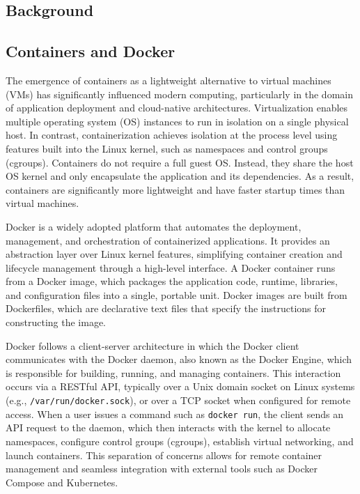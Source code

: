\documentclass[12pt]{report}
\begin{document}
\begin{doublespace}
\chapter{Background}



\section{Containers and Docker}

The emergence of containers as a lightweight alternative to virtual machines (VMs) has significantly influenced modern computing, particularly in the domain of application deployment and cloud-native architectures. Virtualization enables multiple operating system (OS) instances to run in isolation on a single physical host. In contrast, containerization achieves isolation at the process level using features built into the Linux kernel, such as namespaces and control groups (cgroups). Containers do not require a full guest OS. Instead, they share the host OS kernel and only encapsulate the application and its dependencies. As a result, containers are significantly more lightweight and have faster startup times than virtual machines.

Docker is a widely adopted platform that automates the deployment, management, and orchestration of containerized applications. It provides an abstraction layer over Linux kernel features, simplifying container creation and lifecycle management through a high-level interface. A Docker container runs from a Docker image, which packages the application code, runtime, libraries, and configuration files into a single, portable unit. Docker images are built from Dockerfiles, which are declarative text files that specify the instructions for constructing the image.

Docker follows a client-server architecture in which the Docker client communicates with the Docker daemon, also known as the Docker Engine, which is responsible for building, running, and managing containers. This interaction occurs via a RESTful API, typically over a Unix domain socket on Linux systems (e.g., \texttt{/var/run/docker.sock}), or over a TCP socket when configured for remote access. When a user issues a command such as \texttt{docker run}, the client sends an API request to the daemon, which then interacts with the kernel to allocate namespaces, configure control groups (cgroups), establish virtual networking, and launch containers. This separation of concerns allows for remote container management and seamless integration with external tools such as Docker Compose and Kubernetes.


\end{doublespace}
\end{document}

